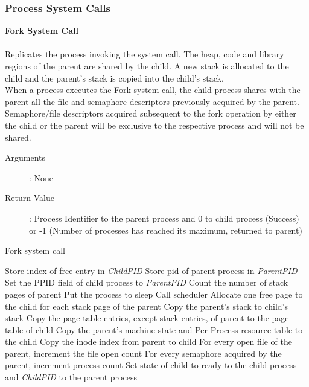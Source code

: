 \documentclass[10pt]{article}
\begin{document}
\subsubsection{Process System Calls}
\textbf{Fork System Call}
\\ \\
Replicates the process invoking the system call. The heap, code and library regions of the parent are shared by the child. A new stack is allocated to the child and the parent's stack is copied into the child's stack.
\\
When a process executes the Fork system call, the child process shares with the parent all the file and semaphore descriptors previously acquired by the parent. Semaphore/file descriptors acquired subsequent to the fork operation by either the child or the parent will be exclusive to the respective process and will not be shared.
\begin{description}
\item[Arguments]: None
\item[Return Value]: Process Identifier to the parent process and 0 to child process (Success) or -1 (Number of processes has reached its maximum, returned to parent)
\end{description} 
\begin{algorithm}
\caption{Fork system call}
\begin{algorithmic}
\ELSE
    \STATE Store index of free entry in \textit{ChildPID}
    \STATE Store pid of parent process in \textit{ParentPID}
\ENDIF
\STATE Set the PPID field of child process to \textit{ParentPID}
\STATE Count the number of stack pages of parent
    \STATE Put the process to sleep
    \STATE Call scheduler
\ENDWHILE
\STATE Allocate one free page to the child for each stack page of the parent
\STATE Copy the parent's stack to child's stack
\STATE Copy the page table entries, except stack entries, of parent to the page table of child
\STATE Copy the parent's machine state and Per-Process resource table to the child
\STATE Copy the inode index from parent to child 
\STATE For every open file of the parent, increment the file open count
\STATE For every semaphore acquired by the parent, increment process count
\STATE Set state of child to ready
 to the child process and \textit{ChildPID} to the parent process
\end{algorithmic}
\end{algorithm}
\vspace{22mm}
\end{document}
